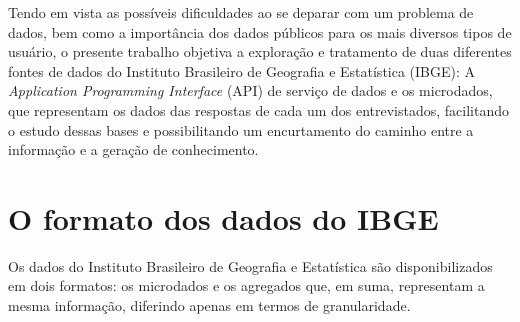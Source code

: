     Tendo em vista as possíveis dificuldades ao se deparar com um problema de dados, bem como a importância dos dados públicos para os mais diversos tipos de usuário, o presente trabalho objetiva a exploração e tratamento de duas diferentes fontes de dados do Instituto Brasileiro de Geografia e Estatística (IBGE): A \textit{Application Programming Interface} (API) de serviço de dados \cite{API-IBGE} e os microdados, que representam os dados das respostas de cada um dos entrevistados, facilitando o estudo dessas bases e possibilitando um encurtamento do caminho entre a informação e a geração de conhecimento.







\section{O formato dos dados do IBGE}

    Os dados do Instituto Brasileiro de Geografia e Estatística são disponibilizados em dois formatos: os microdados e os agregados que, em suma, representam a mesma informação, diferindo apenas em termos de granularidade.

